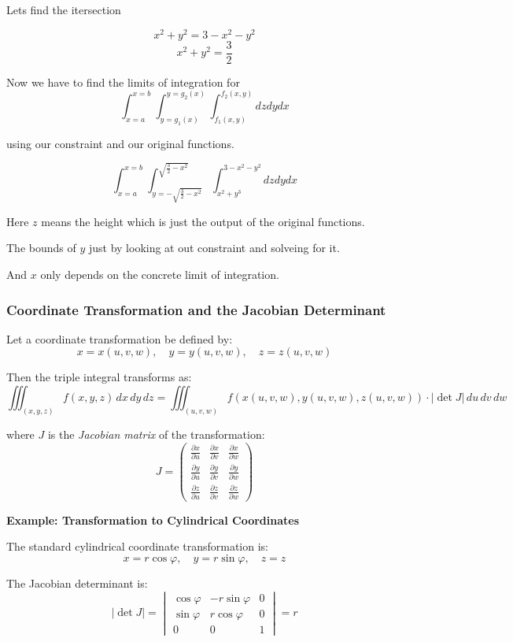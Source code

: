 Lets find the itersection

\[
x^2 + y^2 = 3 -x^2 - y^2 
\]
\[
x^2 + y^2 = \frac{3}{2}
\]

Now we have to find the limits of integration for 
\[
\int_{x=a}^{x=b}\int_{y=g_1(x)}^{y=g_2(x)} \int_{f_1(x,y)}^{f_2(x,y)} dzdydx
\]

using our constraint and our original functions.

\[
\int_{x=a}^{x=b}\int_{y=-\sqrt{\frac{3}{2} - x^2}}^{\sqrt{\frac{3}{2} -x^2}} \int_{x^2 + y^3}^{3-x^2-y^2} dzdydx
\]

Here \(z\) means the height which is just the output
of the original functions.

The bounds of \(y\) just by looking at out constraint and solveing for it.

And \(x\) only depends on the concrete limit of integration.


\subsubsection{Coordinate Transformation and the Jacobian Determinant}

Let a coordinate transformation be defined by:
\[
x = x(u, v, w), \quad y = y(u, v, w), \quad z = z(u, v, w)
\]

Then the triple integral transforms as:
\[
\iiint_{(x, y, z)} f(x, y, z)\, dx\, dy\, dz = \iiint_{(u, v, w)} f(x(u, v, w), y(u, v, w), z(u, v, w)) \cdot \left| \det J \right|\, du\, dv\, dw
\]

where \( J \) is the \emph{Jacobian matrix} of the transformation:
\[
J = 
\begin{pmatrix}
\frac{\partial x}{\partial u} & \frac{\partial x}{\partial v} & \frac{\partial x}{\partial w} \\
\frac{\partial y}{\partial u} & \frac{\partial y}{\partial v} & \frac{\partial y}{\partial w} \\
\frac{\partial z}{\partial u} & \frac{\partial z}{\partial v} & \frac{\partial z}{\partial w}
\end{pmatrix}
\]

\textbf{Example: Transformation to Cylindrical Coordinates}

The standard cylindrical coordinate transformation is:
\[
x = r \cos \varphi, \quad y = r \sin \varphi, \quad z = z
\]

The Jacobian determinant is:
\[
\left| \det J \right| =
\begin{vmatrix}
\cos \varphi & -r \sin \varphi & 0 \\
\sin \varphi & r \cos \varphi & 0 \\
0 & 0 & 1
\end{vmatrix}
= r
\]

